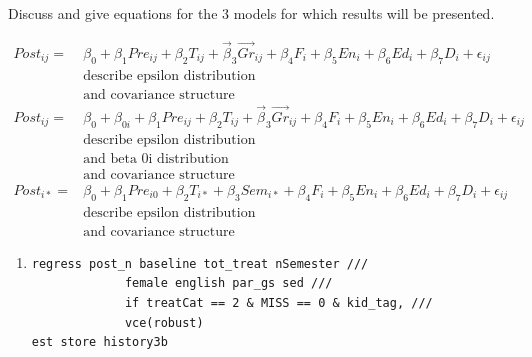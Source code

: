 \documentclass[a0,landscape]{a0poster}
\begin{document}
\begin{multicols}{3}
Discuss and give equations for the 3 models for which results will be presented.

\begin{align}
\mathit{Post}_{ij} = & \beta_0 
                     + \beta_1 \mathit{Pre}_{ij}
                     + \beta_2 \mathit{T}_{ij}
                     + \vec\beta_{3} \overrightarrow{\mathit{Gr}}_{ij}
                     + \beta_4 \mathit{F}_{i}
                     + \beta_5 \mathit{En}_{i}
                     + \beta_6 \mathit{Ed}_{i}
                     + \beta_7 \mathit{D}_{i}
                     + \epsilon_{ij}
                     \label{eq:model1} \\
& \text{describe epsilon distribution} \nonumber \\
& \text{and covariance structure} \nonumber \\
\mathit{Post}_{ij} = & \beta_0 + \beta_{0i}
                     + \beta_1 \mathit{Pre}_{ij}
                     + \beta_2 \mathit{T}_{ij}
                     + \vec\beta_{3} \overrightarrow{\mathit{Gr}}_{ij}
                     + \beta_4 \mathit{F}_{i}
                     + \beta_5 \mathit{En}_{i}
                     + \beta_6 \mathit{Ed}_{i}
                     + \beta_7 \mathit{D}_{i}
                     + \epsilon_{ij}
                     \label{eq:model2} \\
& \text{describe epsilon distribution} \nonumber \\
& \text{and beta 0i distribution} \nonumber \\
& \text{and covariance structure} \nonumber \\
\mathit{Post}_{i*} = & \beta_0
                     + \beta_1 \mathit{Pre}_{i0}
                     + \beta_2 \mathit{T}_{i*}
                     + \beta_3 \mathit{Sem}_{i*}
                     + \beta_4 \mathit{F}_{i}
                     + \beta_5 \mathit{En}_{i}
                     + \beta_6 \mathit{Ed}_{i}
                     + \beta_7 \mathit{D}_{i}
                     + \epsilon_{ij}
                     \label{eq:model3} \\
& \text{describe epsilon distribution} \nonumber \\
& \text{and covariance structure} \nonumber
\end{align} 

\begin{enumerate}
\item \begin{verbatim}
regress post_n baseline tot_treat nSemester ///
			 female english par_gs sed ///
 			 if treatCat == 2 & MISS == 0 & kid_tag, ///
			 vce(robust)
est store history3b
\end{verbatim}
\end{enumerate}


\end{multicols}
\end{document}
